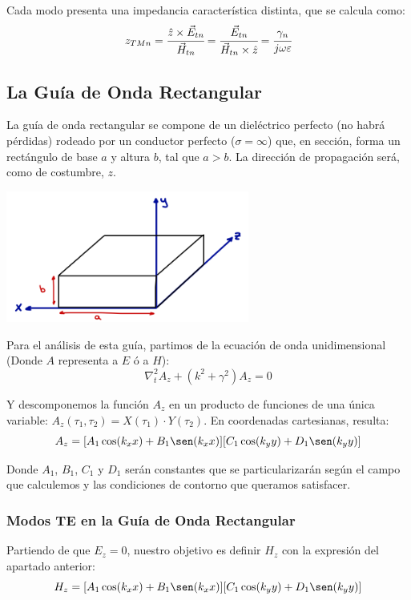 \documentclass[12pt]{article}
\begin{document}
Cada modo presenta una impedancia caracter\'istica distinta, que se calcula como:
$$z_{TMn} = \cfrac{\hat{z} \times \vec{E}_{tn}}{\vec{H}_{tn}} = \cfrac{\vec{E}_{tn}}{\vec{H}_{tn} \times \hat{z}} = \cfrac{\gamma_n}{j\omega\varepsilon}$$

\subsection{La Gu\'ia de Onda Rectangular}

La gu\'ia de onda rectangular se compone de un diel\'ectrico perfecto (no habr\'a p\'erdidas) rodeado por un conductor perfecto ($\sigma = \infty$) que, en secci\'on, forma un rect\'angulo de base $a$ y altura $b$, tal que $a>b$. La direcci\'on de propagaci\'on ser\'a, como de costumbre, $z$.
\begin{center}
	\includegraphics[width=8cm]{img/Guia_de_onda_rectangular.jpg}
\end{center}

Para el an\'alisis de esta gu\'ia, partimos de la ecuaci\'on de onda unidimensional (Donde $A$ representa a $E$ \'o a $H$):
$$\nabla^2 _t A_z + (k^2 + \gamma^2)A_z = 0$$

Y descomponemos la funci\'on $A_z$ en un producto de funciones de una \'unica variable: $A_z(\tau_1, \tau_2) = X(\tau_1) \cdot Y(\tau_2)$. En coordenadas cartesianas, resulta:
$$A_z = [A_1 \cos(k_xx) + B_1\sen(k_xx)][C_1\cos(k_yy) + D_1\sen(k_yy)]$$

Donde $A_1$, $B_1$, $C_1$ y $D_1$ ser\'an constantes que se particularizar\'an seg\'un el campo que calculemos y las condiciones de contorno que queramos satisfacer.

\subsubsection{Modos TE en la Gu\'ia de Onda Rectangular}

Partiendo de que $E_z = 0$, nuestro objetivo es definir $H_z$ con la expresi\'on del apartado anterior:
$$H_z = [A_1 \cos(k_xx) + B_1\sen(k_xx)][C_1\cos(k_yy) + D_1\sen(k_yy)]$$
\end{document}

